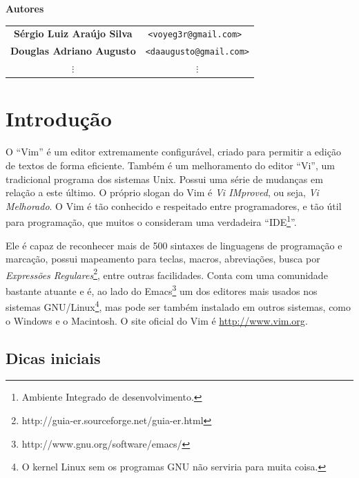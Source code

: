 \documentclass[10pt,a4paper,openany]{book}
\begin{document}
\newpage

\begin{center}
{\Huge \bf Autores}

\vspace{2cm}

\begin{tabular}{cc}

\bf Sérgio Luiz Araújo Silva & \tt <voyeg3r@gmail.com> \\
\bf Douglas Adriano Augusto & \tt <daaugusto@gmail.com>\\
$\vdots$ & $\vdots$ \\

\end{tabular}

\end{center}

\newpage
\tableofcontents

\chapter{Introdução}

O ``Vim'' é um editor extremamente configurável, criado para permitir a edição
de textos de forma eficiente. Também é um melhoramento do editor ``Vi'', um
tradicional programa dos sistemas Unix. Possui uma série de mudanças em
relação a este último. O próprio slogan do Vim é {\em Vi IMproved}, ou seja,
{\em Vi Melhorado}.  O Vim é tão conhecido e respeitado entre programadores, e tão
útil para programação, que muitos o consideram uma verdadeira
``IDE\footnote{Ambiente Integrado de desenvolvimento.}''.

Ele é capaz de reconhecer mais de 500 sintaxes de linguagens de programação e
marcação, possui mapeamento para teclas, macros, abreviações, busca por
{\em{Expressões
Regulares}}\footnote{http://guia-er.sourceforge.net/guia-er.html}, entre
outras facilidades. Conta com uma comunidade bastante atuante e é, ao lado do
Emacs\footnote{http://www.gnu.org/software/emacs/} um dos editores mais usados
nos sistemas GNU/Linux\footnote{O kernel Linux sem os programas GNU não
serviria para muita coisa.}, mas pode ser também instalado em outros sistemas,
como o Windows e o Macintosh.  O site oficial do Vim é \url{http://www.vim.org}.


\section{Dicas iniciais}\label{Dicas iniciais}
\end{document}
